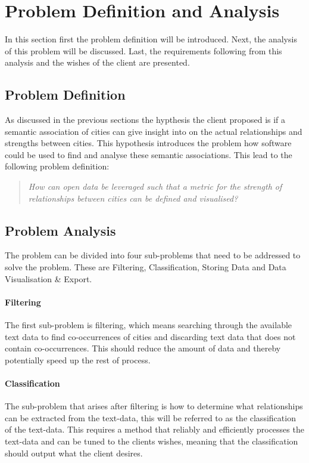 \section{Problem Definition and Analysis}\label{sec:problem-definition-analysis}
In this section first the problem definition will be introduced. Next, the analysis of this problem will be discussed. Last, the requirements following from this analysis and the wishes of the client are presented.

\subsection{Problem Definition}
As discussed in the previous sections the hypthesis the client proposed is if a semantic association of cities can give insight into on the actual relationships and strengths between cities. This hypothesis introduces the problem how software could be used to find and analyse these semantic associations. This lead to the following problem definition:\\

\begin{quote} 
\centering 
\textit{How can open data be leveraged such that a metric for the strength of relationships between cities can be defined and visualised?}
\end{quote}

\subsection{Problem Analysis}
The problem can be divided into four sub-problems that need to be addressed to solve the problem. These are Filtering, Classification, Storing Data and  Data Visualisation \& Export. 

\paragraph{Filtering}
The first sub-problem is filtering, which means searching through the available text data to find co-occurrences of cities and discarding text data that does not contain co-occurrences. This should reduce the amount of data and thereby potentially speed up the rest of process.

\paragraph{Classification}
The sub-problem that arises after filtering is how to determine what relationships can be extracted from the text-data, this will be referred to as the classification of the text-data. This requires a method that reliably and efficiently processes the text-data and can be tuned to the clients wishes, meaning that the classification should output what the client desires. 

